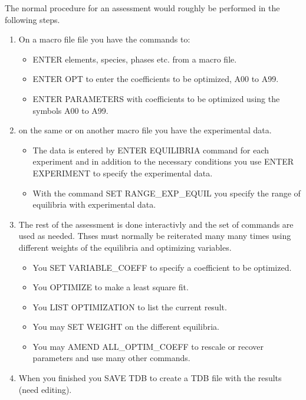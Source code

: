 \documentclass[12pt]{article}
\begin{document}
The normal procedure for an assessment would roughly be performed
in the following steps.

\begin{enumerate}
\item On a  macro file file you have the commands to:
  \begin{itemize}
  \item ENTER elements, species, phases etc. from a macro file.
  \item ENTER OPT to enter the coefficients to be optimized, A00 to A99.
  \item ENTER PARAMETERS with coefficients to be optimized using the
    symbols A00 to A99.
    \end{itemize}

\item on the same or on another macro file you have the experimental
  data.
  \begin{itemize}
  \item The data is entered by ENTER EQUILIBRIA command for each
    experiment and in addition to the necessary conditions you use
    ENTER EXPERIMENT to specify the experimental data.
  \item With the command SET RANGE\_EXP\_EQUIL you specify the range of
    equilibria with experimental data.
  \end{itemize}

\item The rest of the assessment is done interactivly and the set of
  commands are used as needed.  Thses must normally be reiterated many
  many times using different weights of the equilibria and optimizing
  variables.
  \begin{itemize}
  \item You SET VARIABLE\_COEFF to specify a coefficient to be optimized.
  \item You OPTIMIZE to make a least square fit.  
  \item You LIST OPTIMIZATION to list the current result.
  \item You may SET WEIGHT on the different equilibria.
  \item You may AMEND ALL\_OPTIM\_COEFF to rescale or recover
    parameters and use many other commands.
  \end{itemize}

\item When you finished you SAVE TDB to create a TDB file with the
  results (need editing).
\end{enumerate}
\end{document}
